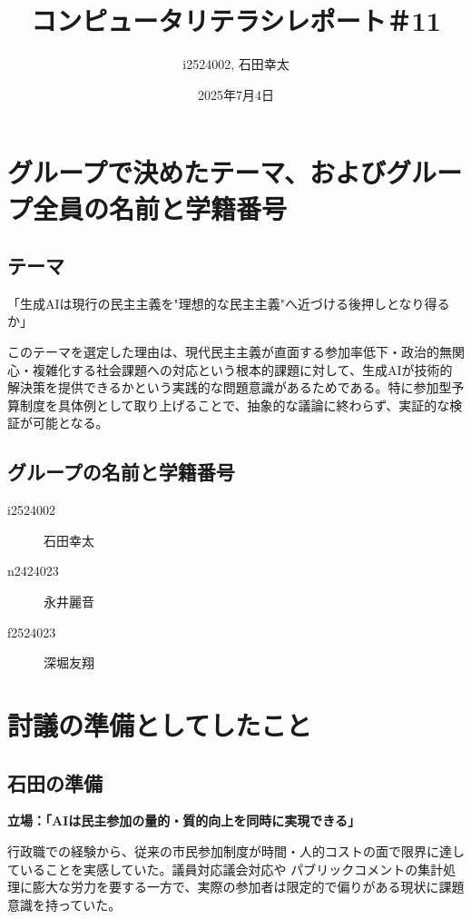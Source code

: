 \documentclass[12pt,a4j]{jarticle}
\begin{document}
\title{コンピュータリテラシレポート＃11}
\author{i2524002, 石田幸太}
\date{2025年7月4日}
\maketitle

\section{グループで決めたテーマ、およびグループ全員の名前と学籍番号}

\subsection{テーマ}
「生成AIは現行の民主主義を"理想的な民主主義"へ近づける後押しとなり得るか」

このテーマを選定した理由は、現代民主主義が直面する参加率低下・政治的無関心・複雑化する社会課題への対応という根本的課題に対して、生成AIが技術的解決策を提供できるかという実践的な問題意識があるためである。特に参加型予算制度を具体例として取り上げることで、抽象的な議論に終わらず、実証的な検証が可能となる。

\subsection{グループの名前と学籍番号}

\begin{description}
\item[i2524002] 石田幸太
\item[n2424023] 永井麗音
\item[f2524023] 深堀友翔
\end{description}

\section{討議の準備としてしたこと}

\subsection{石田の準備}
\textbf{立場：「AIは民主参加の量的・質的向上を同時に実現できる」}

行政職での経験から、従来の市民参加制度が時間・人的コストの面で限界に達していることを実感していた。議員対応議会対応や パブリックコメントの集計処理に膨大な労力を要する一方で、実際の参加者は限定的で偏りがある現状に課題意識を持っていた。
\end{document}
